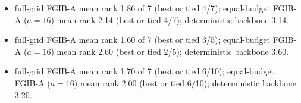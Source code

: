 \begin{itemize}
\item[CLS] full-grid FGIB-A mean rank 1.86 of 7 (best or tied 4/7); equal-budget FGIB-A ($a{=}16$) mean rank 2.14 (best or tied 4/7); deterministic backbone 3.14.
\item[REG] full-grid FGIB-A mean rank 1.60 of 7 (best or tied 3/5); equal-budget FGIB-A ($a{=}16$) mean rank 2.60 (best or tied 2/5); deterministic backbone 3.60.
\item[exAgeDB] full-grid FGIB-A mean rank 1.70 of 7 (best or tied 6/10); equal-budget FGIB-A ($a{=}16$) mean rank 2.00 (best or tied 6/10); deterministic backbone 3.20.
\end{itemize}
